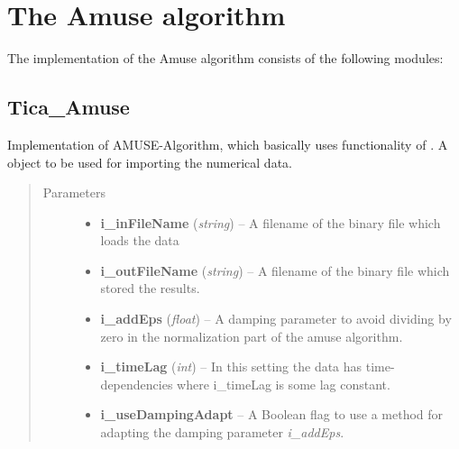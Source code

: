 \documentclass[letterpaper,10pt,english]{sphinxmanual}
\begin{document}
\chapter{The Amuse algorithm}
\label{tica:the-amuse-algorithm}\label{tica::doc}
The implementation of the Amuse algorithm consists of the following modules:


\section{Tica\_Amuse}
\label{tica:tica-amuse}\label{tica:module-Tica_Amuse}

\begin{fulllineitems}
\label{tica:Tica_Amuse.TicaAmuse}
Implementation of AMUSE-Algorithm, which basically uses functionality of {\hyperref[tica:Tica_PrincipleComp.TicaPrinComp]{}}.
A {\hyperref[common:common_data_importer.CommonDataImporter]{}} object to be used for importing the numerical data.
\begin{quote}\begin{description}
\item[{Parameters}] \leavevmode\begin{itemize}
\item {} 
\textbf{i\_inFileName} (\emph{string}) -- A filename of the binary file which loads the data

\item {} 
\textbf{i\_outFileName} (\emph{string}) -- A filename of the binary file which stored the results.

\item {} 
\textbf{i\_addEps} (\emph{float}) -- A damping parameter to avoid dividing by zero in the normalization part of the amuse algorithm.

\item {} 
\textbf{i\_timeLag} (\emph{int}) -- In this setting the data has time-dependencies where i\_timeLag is some lag constant.

\item {} 
\textbf{i\_useDampingAdapt} -- A Boolean flag to use a method for adapting the damping parameter \emph{i\_addEps}.


\end{itemize}
\end{description}
\end{quote}
\end{fulllineitems}
\end{document}
